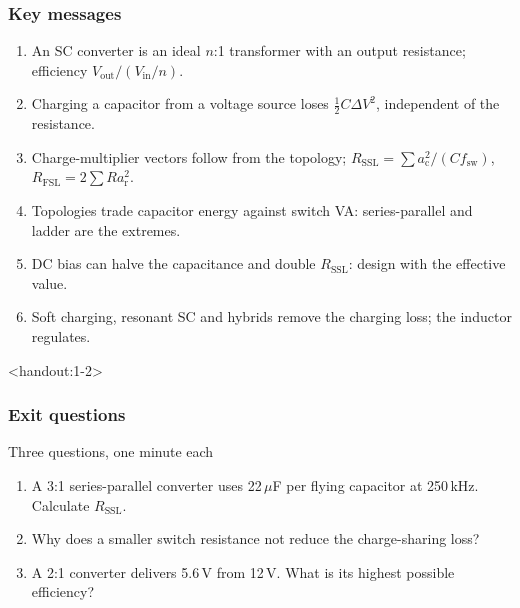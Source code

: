 \begin{frame}
	\frametitle{Key messages}
	\begin{enumerate}
		\item An SC converter is an ideal $n$:1 transformer with an output resistance; efficiency $V_\mathrm{out}/(V_\mathrm{in}/n)$.
		\item Charging a capacitor from a voltage source loses $\tfrac12C\Delta V^2$, independent of the resistance.
		\item Charge-multiplier vectors follow from the topology; $R_\mathrm{SSL}=\sum a_\mathrm{c}^2/(Cf_\mathrm{sw})$, $R_\mathrm{FSL}=2\sum Ra_\mathrm{r}^2$.
		\item Topologies trade capacitor energy against switch VA: series-parallel and ladder are the extremes.
		\item DC bias can halve the capacitance and double $R_\mathrm{SSL}$: design with the effective value.
		\item Soft charging, resonant SC and hybrids remove the charging loss; the inductor regulates.
	\end{enumerate}
\end{frame}

\begin{frame}<handout:1-2>
	\frametitle{Exit questions}
	\begin{varblock}[\textwidth]{Three questions, one minute each}
		\begin{enumerate}
			\item A 3:1 series-parallel converter uses 22\,$\mu$F per flying capacitor at 250\,kHz. Calculate $R_\mathrm{SSL}$.
			\item Why does a smaller switch resistance not reduce the charge-sharing loss?
			\item A 2:1 converter delivers 5.6\,V from 12\,V. What is its highest possible efficiency?
		\end{enumerate}
	\end{varblock}
\end{frame}

